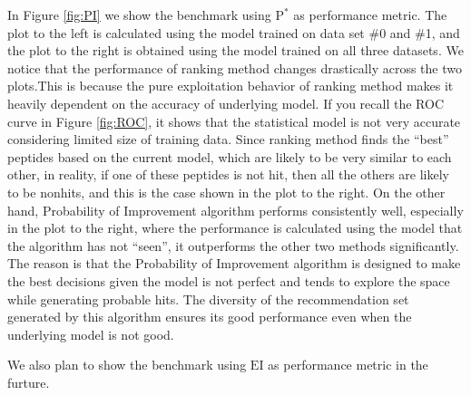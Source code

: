 \documentclass[opre,nonblindrev]{informs3} %
\newcommand{\EI}{\mathrm{EI}}
\newcommand{\PI}{\text{P}^*}
\begin{document}
In Figure \ref{fig:PI} we show the benchmark using $\PI$ as performance metric. The plot to the left is calculated using the model trained on data set \#0 and \#1, and the plot to the right is obtained using the model trained on all three datasets. We notice that the performance of ranking method changes drastically across the two plots.This is because the pure exploitation behavior of ranking method makes it heavily dependent on the accuracy of underlying model. If you recall the ROC curve in Figure \ref{fig:ROC}, it shows that the statistical model is not very accurate considering limited size of training data. Since ranking method finds the ``best'' peptides based on the current model, which are  likely to be very similar to each other, in reality, if one of these peptides is not hit, then all the others are likely to be nonhits, and this is the case shown in the plot to the right. On the other hand, Probability of Improvement algorithm performs consistently well, especially in the plot to the right, where the performance is calculated using the model that the algorithm has not ``seen'', it outperforms the other two methods significantly. The reason is that the Probability of Improvement algorithm is designed to make the best decisions given the model is not perfect and tends to explore the space while generating probable hits. The diversity of the recommendation set generated by this algorithm ensures its good performance even when the underlying model is not good.

We also plan to show the benchmark using $\EI$ as performance metric in the furture.
\end{document}
